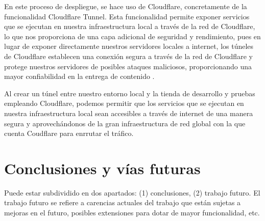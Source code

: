 \documentclass[12pt]{article}
\begin{document}
En este proceso de despliegue, se hace uso de Cloudflare, concretamente de la funcionalidad Cloudflare Tunnel. Esta funcionalidad permite exponer servicios que se ejecutan
en nuestra infraestructura local a través de la red de Cloudflare, lo que nos proporciona de una capa adicional de seguridad y rendimiento, pues en lugar de 
exponer directamente nuestros servidores locales a internet, los túneles de Cloudflare establecen una conexión segura a través de la red de Cloudflare y protege nuestros
servidores de posibles ataques maliciosos, proporcionando una mayor confiabilidad en la entrega de contenido \cite{cloudflare}. 

Al crear un túnel entre nuestro entorno local y la tienda de desarrollo y pruebas empleando Cloudflare, podemos permitir que los servicios que se ejecutan en nuestra infraestructura local
sean accesibles a través de internet de una manera segura y aprovechándonos de la gran infraestructura de red global con la que cuenta Coudflare para enrrutar el tráfico. 

\section{Conclusiones y vías futuras}
Puede estar subdividido en dos apartados: (1) conclusiones, (2) trabajo futuro. El trabajo futuro se refiere a carencias actuales del trabajo que están sujetas a mejoras en el futuro, posibles extensiones para dotar de mayor funcionalidad, etc.
\end{document}
